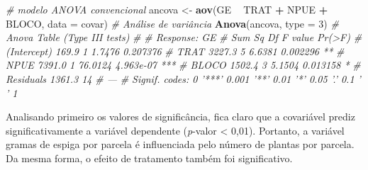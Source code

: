 \documentclass[
]{book}
\newenvironment{Shaded}{\begin{snugshade}}{\end{snugshade}}
\newcommand{\CommentTok}[1]{\textcolor[rgb]{0.56,0.35,0.01}{\textit{#1}}}
\newcommand{\DataTypeTok}[1]{\textcolor[rgb]{0.13,0.29,0.53}{#1}}
\newcommand{\DecValTok}[1]{\textcolor[rgb]{0.00,0.00,0.81}{#1}}
\newcommand{\KeywordTok}[1]{\textcolor[rgb]{0.13,0.29,0.53}{\textbf{#1}}}
\newcommand{\NormalTok}[1]{#1}
\newcommand{\OperatorTok}[1]{\textcolor[rgb]{0.81,0.36,0.00}{\textbf{#1}}}
\newcommand{\StringTok}[1]{\textcolor[rgb]{0.31,0.60,0.02}{#1}}
\begin{document}
\begin{Shaded}
\begin{Highlighting}[]
\CommentTok{# modelo ANOVA convencional}
\NormalTok{ancova <-}\StringTok{ }\KeywordTok{aov}\NormalTok{(GE }\OperatorTok{~}\StringTok{  }\NormalTok{TRAT }\OperatorTok{+}\StringTok{ }\NormalTok{NPUE }\OperatorTok{+}\StringTok{ }\NormalTok{BLOCO, }\DataTypeTok{data =}\NormalTok{ covar)}
\CommentTok{# Análise de variância}
\KeywordTok{Anova}\NormalTok{(ancova, }\DataTypeTok{type =} \DecValTok{3}\NormalTok{)}
\CommentTok{# Anova Table (Type III tests)}
\CommentTok{# }
\CommentTok{# Response: GE}
\CommentTok{#             Sum Sq Df F value    Pr(>F)    }
\CommentTok{# (Intercept)  169.9  1  1.7476  0.207376    }
\CommentTok{# TRAT        3227.3  5  6.6381  0.002296 ** }
\CommentTok{# NPUE        7391.0  1 76.0124 4.963e-07 ***}
\CommentTok{# BLOCO       1502.4  3  5.1504  0.013158 *  }
\CommentTok{# Residuals   1361.3 14                      }
\CommentTok{# ---}
\CommentTok{# Signif. codes:  0 '***' 0.001 '**' 0.01 '*' 0.05 '.' 0.1 ' ' 1}
\end{Highlighting}
\end{Shaded}

Analisando primeiro os valores de significância, fica claro que a covariável prediz significativamente a variável dependente (\emph{p}-valor \textless{} 0,01). Portanto, a variável gramas de espiga por parcela é influenciada pelo número de plantas por parcela. Da mesma forma, o efeito de tratamento também foi significativo.

   
\end{document}
